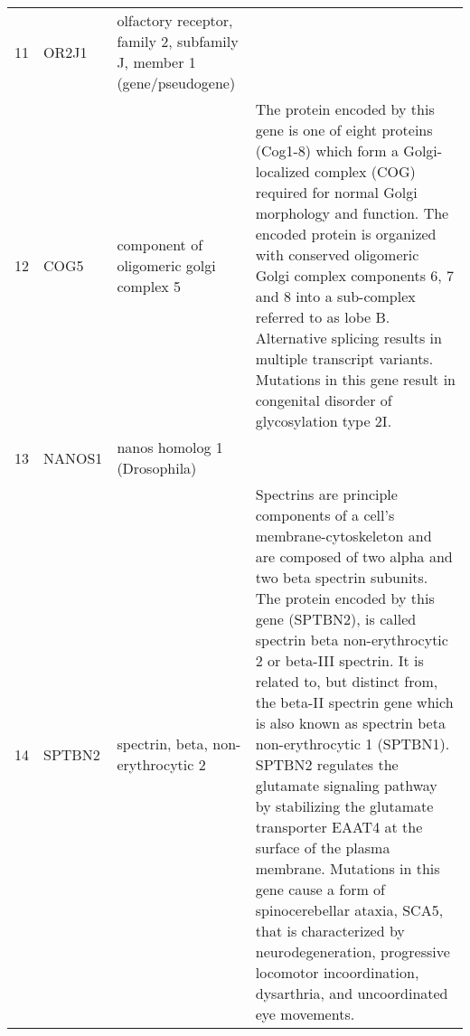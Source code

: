\documentclass[11pt, landscape]{article}   	%
\begin{document}
\begin{table}[ht]
\begin{tabular}{rlp{4cm}p{12cm}}
  11 & OR2J1 & olfactory receptor, family 2, subfamily J, member 1 (gene/pseudogene) &  \\ 
  12 & COG5 & component of oligomeric golgi complex 5 & The protein encoded by this gene is one of eight proteins (Cog1-8) which form a Golgi-localized complex (COG) required for normal Golgi morphology and function. The encoded protein is organized with conserved oligomeric Golgi complex components 6, 7 and 8 into a sub-complex referred to as lobe B. Alternative splicing results in multiple transcript variants. Mutations in this gene result in congenital disorder of glycosylation type 2I. \\ 
  13 & NANOS1 & nanos homolog 1 (Drosophila) &  \\ 
  14 & SPTBN2 & spectrin, beta, non-erythrocytic 2 & Spectrins are principle components of a cell's membrane-cytoskeleton and are composed of two alpha and two beta spectrin subunits. The protein encoded by this gene (SPTBN2), is called spectrin beta non-erythrocytic 2 or beta-III spectrin. It is related to, but distinct from, the beta-II spectrin gene which is also known as spectrin beta non-erythrocytic 1 (SPTBN1). SPTBN2 regulates the glutamate signaling pathway by stabilizing the glutamate transporter EAAT4 at the surface of the plasma membrane. Mutations in this gene cause a form of spinocerebellar ataxia, SCA5, that is characterized by neurodegeneration, progressive locomotor incoordination, dysarthria, and uncoordinated eye movements. \\ 
    \hline
\end{tabular}
\end{table}
\end{document}

